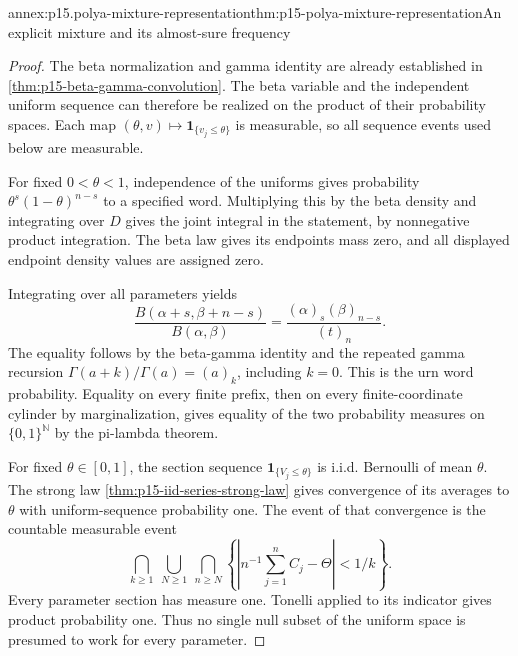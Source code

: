 \begin{annexitem}{annex:p15.polya-mixture-representation}{thm:p15-polya-mixture-representation}{An explicit mixture and its almost-sure frequency}
\begin{proof}
The beta normalization and gamma identity are already established in
\cref{thm:p15-beta-gamma-convolution}.
The beta variable and the independent uniform sequence can therefore
be realized on the product of their probability spaces.
Each map \((\theta,v)\mapsto\mathbf1_{\{v_j\leq\theta\}}\)
is measurable, so all sequence events used below are measurable.

For fixed \(0<\theta<1\), independence of the uniforms gives
probability \(\theta^s(1-\theta)^{n-s}\) to a specified word.
Multiplying this by the beta density and integrating over \(D\)
gives the joint integral in the statement, by nonnegative product
integration. The beta law gives its endpoints mass zero, and all
displayed endpoint density values are assigned zero.

Integrating over all parameters yields
\[
 \frac{B(\alpha+s,\beta+n-s)}{B(\alpha,\beta)}
           =\frac{(\alpha)_s(\beta)_{n-s}}{(t)_n}.
\]
The equality follows by the beta-gamma identity and the repeated
gamma recursion
\(\Gamma(a+k)/\Gamma(a)=(a)_k\), including \(k=0\).
This is the urn word probability. Equality on every finite prefix,
then on every finite-coordinate cylinder by marginalization, gives
equality of the two probability measures on
\(\{0,1\}^{\mathbb N}\) by the pi-lambda theorem.

For fixed \(\theta\in[0,1]\), the section sequence
\(\mathbf1_{\{V_j\leq\theta\}}\) is i.i.d. Bernoulli of mean \(\theta\).
The strong law \cref{thm:p15-iid-series-strong-law} gives convergence
of its averages to \(\theta\) with uniform-sequence probability one.
The event of that convergence is the countable measurable event
\[
 \bigcap_{k\geq1}\ \bigcup_{N\geq1}\ \bigcap_{n\geq N}
 \left\{\left|n^{-1}\sum_{j=1}^nC_j-\Theta\right|<1/k\right\}.
\]
Every parameter section has measure one. Tonelli applied to its
indicator gives product probability one. Thus no single null subset
of the uniform space is presumed to work for every parameter.
\end{proof}
\end{annexitem}

